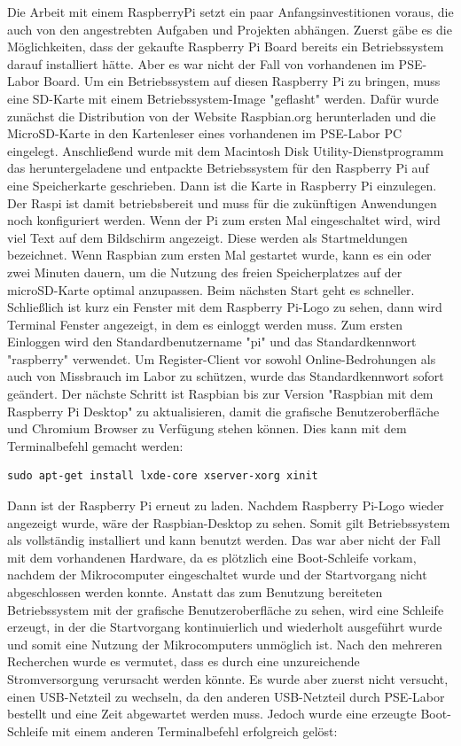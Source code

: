 Die Arbeit mit einem RaspberryPi setzt ein paar Anfangsinvestitionen voraus, die auch von den angestrebten Aufgaben und Projekten abhängen. Zuerst gäbe es die Möglichkeiten, dass der gekaufte Raspberry Pi Board bereits ein Betriebssystem darauf installiert hätte. Aber es war nicht der Fall von vorhandenen im PSE-Labor Board. Um ein Betriebssystem auf diesen Raspberry Pi zu bringen, muss eine SD-Karte mit einem Betriebssystem-Image "geflasht" werden. Dafür wurde zunächst die Distribution von der Website Raspbian.org herunterladen und die MicroSD-Karte in den Kartenleser eines vorhandenen im PSE-Labor PC eingelegt. Anschließend wurde mit dem Macintosh Disk Utility-Dienstprogramm das heruntergeladene und entpackte Betriebssystem für den Raspberry Pi auf eine Speicherkarte geschrieben. Dann ist die Karte in Raspberry Pi einzulegen. Der Raspi ist damit betriebsbereit und muss für die zukünftigen Anwendungen noch konfiguriert werden. Wenn der Pi zum ersten Mal eingeschaltet wird, wird viel Text auf dem Bildschirm angezeigt. Diese werden als Startmeldungen bezeichnet. Wenn Raspbian zum ersten Mal gestartet wurde, kann es ein oder zwei Minuten dauern, um die Nutzung des freien Speicherplatzes auf der microSD-Karte optimal anzupassen. Beim nächsten Start geht es schneller. Schließlich ist kurz ein Fenster mit dem Raspberry Pi-Logo zu sehen, dann wird Terminal Fenster angezeigt, in dem es einloggt werden muss. Zum ersten Einloggen wird den Standardbenutzername "pi" und das Standardkennwort  "raspberry" verwendet. Um Register-Client vor sowohl Online-Bedrohungen als auch von Missbrauch im Labor zu schützen, wurde das Standardkennwort sofort geändert. Der nächste Schritt ist Raspbian bis zur Version "Raspbian mit dem Raspberry Pi Desktop" zu aktualisieren, damit die grafische Benutzeroberfläche und Chromium Browser zu Verfügung stehen können. Dies kann mit dem Terminalbefehl gemacht werden:
\begin{lstlisting}[caption={[Terminalbefehl für die Installation der GUI] },captionpos=b]
sudo apt-get install lxde-core xserver-xorg xinit
\end{lstlisting}
Dann ist der Raspberry Pi erneut zu laden. Nachdem Raspberry Pi-Logo wieder angezeigt wurde, wäre der Raspbian-Desktop zu sehen. Somit gilt Betriebssystem als vollständig installiert und kann benutzt werden. Das war aber nicht der Fall mit dem vorhandenen Hardware, da es plötzlich eine Boot-Schleife vorkam, nachdem der Mikrocomputer eingeschaltet wurde und der Startvorgang nicht abgeschlossen werden konnte. Anstatt das zum Benutzung bereiteten Betriebssystem mit der grafische Benutzeroberfläche zu sehen,  wird eine Schleife erzeugt, in der die Startvorgang kontinuierlich und wiederholt ausgeführt wurde und somit eine Nutzung der Mikrocomputers unmöglich ist. Nach den mehreren Recherchen wurde es vermutet, dass es durch eine unzureichende Stromversorgung verursacht werden könnte. Es wurde aber zuerst nicht versucht, einen USB-Netzteil zu wechseln, da den anderen USB-Netzteil durch PSE-Labor bestellt und eine Zeit abgewartet werden muss. Jedoch wurde eine erzeugte Boot-Schleife mit einem anderen Terminalbefehl erfolgreich gelöst:
